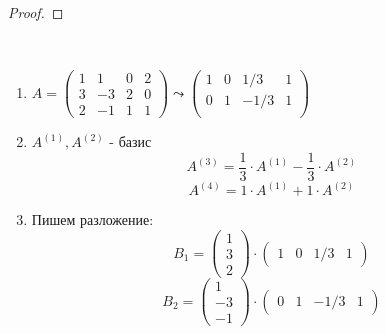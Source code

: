 \begin{lemma}
\begin{proof}
    \end{proof}

    \bigskip

    \begin{example}~
        
        \begin{enumerate}
            \item $A = \begin{pmatrix}
                1 & 1 & 0 & 2 \\
                3 & -3 & 2 & 0 \\
                2 & -1 & 1 & 1
            \end{pmatrix} \leadsto \begin{pmatrix}
                1 & 0 & 1/3 & 1 \\
                0& 1 & -1/3 & 1 \\
            \end{pmatrix}$
            \item $A^{(1)}, A^{(2)}$ - базис
            $$A^{(3)} = \frac{1}{3} \cdot A^{(1)} - \frac{1}{3} \cdot A^{(2)}$$
            $$A^{(4)} = 1 \cdot A^{(1)} + 1 \cdot A^{(2)}$$
            \item Пишем разложение:
            $$B_1 = \begin{pmatrix}
                1 \\ 3 \\ 2
            \end{pmatrix} \cdot \begin{pmatrix}
                1 & 0 & 1/3 & 1
            \end{pmatrix}$$
            $$B_2 = \begin{pmatrix}
                1 \\ -3 \\ -1
            \end{pmatrix} \cdot \begin{pmatrix}
                0 & 1 & -1/3 & 1
            \end{pmatrix}$$
        \end{enumerate}

    \end{example}

\end{lemma}